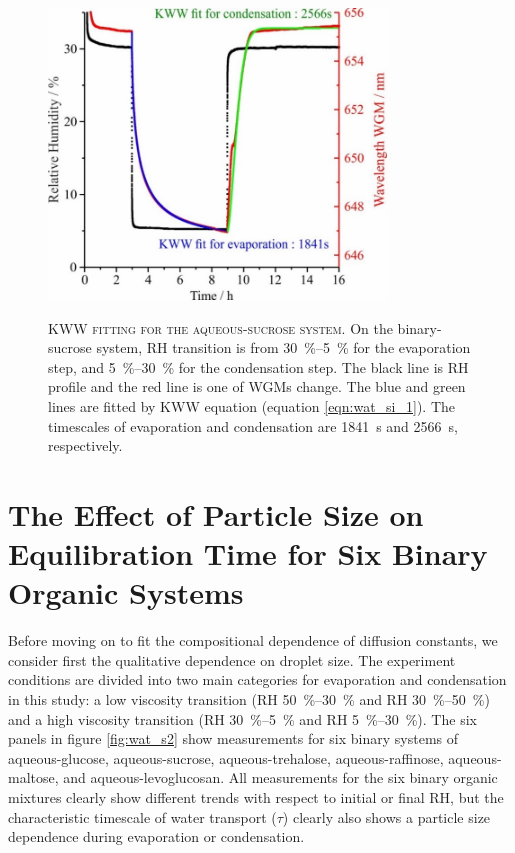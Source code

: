 \begin{figure}
    \centering
    \caption[KWW fitting for the aqueous-sucrose system]{\textsc{KWW fitting for the aqueous-sucrose system}. On the binary-sucrose system, RH transition is from \SIrange{30}{5}{\percent} for the evaporation step, and \SIrange{5}{30}{\percent} for the condensation step. The black line is RH profile and the red line is one of WGMs change. The blue and green lines are fitted by KWW equation (equation \ref{eqn:wat_si_1}). The timescales of evaporation and condensation are \SI{1841}{\second} and \SI{2566}{\second}, respectively.}
    \includegraphics[width=0.8\textwidth]{chapters/water_hopping/figures/image003.jpg}
    \label{fig:wat_s1}
\end{figure}

\section{The Effect of Particle Size on Equilibration Time for Six Binary Organic Systems}
Before moving on to fit the compositional dependence of diffusion constants, we consider first the qualitative dependence on droplet size. The experiment conditions are divided into two main categories for evaporation and condensation in this study: a low viscosity transition (RH \SIrange{50}{30}{\percent} and RH \SIrange{30}{50}{\percent}) and a high viscosity transition (RH \SIrange{30}{5}{\percent} and RH \SIrange{5}{30}{\percent}). The six panels in figure \ref{fig:wat_s2} show measurements for six binary systems of aqueous-glucose, aqueous-sucrose, aqueous-trehalose, aqueous-raffinose, aqueous-maltose, and aqueous-levoglucosan. All measurements for the six binary organic mixtures clearly show different trends with respect to initial or final RH, but the characteristic timescale of water transport ($\tau$) clearly also shows a particle size dependence during evaporation or condensation.

